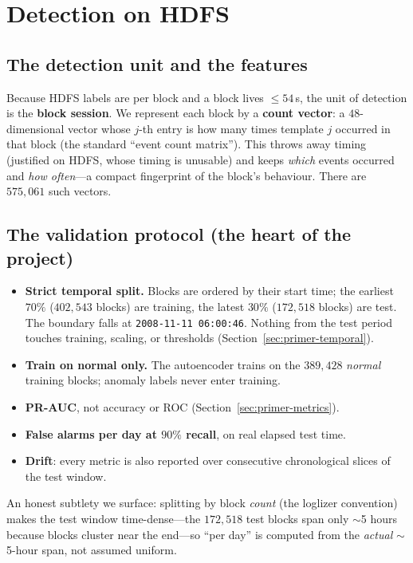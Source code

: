 \documentclass[11pt,a4paper]{article}
\newcommand{\keyword}[1]{\textbf{\color{accent}#1}}
\newcommand{\code}[1]{\texttt{\small #1}}
\begin{document}
\section{Detection on HDFS}
\label{sec:detect}

\subsection{The detection unit and the features}
Because HDFS labels are per block and a block lives $\leq54$\,s, the unit of
detection is the \keyword{block session}. We represent each block by a
\keyword{count vector}: a $48$-dimensional vector whose $j$-th entry is how many
times template $j$ occurred in that block (the standard ``event count matrix'').
This throws away timing (justified on HDFS, whose timing is unusable) and keeps
\emph{which} events occurred and \emph{how often}---a compact fingerprint of the
block's behaviour. There are $575{,}061$ such vectors.

\subsection{The validation protocol (the heart of the project)}
\begin{itemize}[nosep,leftmargin=1.5em]
  \item \keyword{Strict temporal split.} Blocks are ordered by their start time;
  the earliest $70\%$ ($402{,}543$ blocks) are training, the latest $30\%$
  ($172{,}518$ blocks) are test. The boundary falls at
  \code{2008-11-11 06:00:46}. Nothing from the test period touches training,
  scaling, or thresholds (Section~\ref{sec:primer-temporal}).
  \item \keyword{Train on normal only.} The autoencoder trains on the
  $389{,}428$ \emph{normal} training blocks; anomaly labels never enter training.
  \item \keyword{PR-AUC}, not accuracy or ROC (Section~\ref{sec:primer-metrics}).
  \item \keyword{False alarms per day at $90\%$ recall}, on real elapsed test
  time.
  \item \keyword{Drift}: every metric is also reported over consecutive
  chronological slices of the test window.
\end{itemize}
An honest subtlety we surface: splitting by block \emph{count} (the loglizer
convention) makes the test window time-dense---the $172{,}518$ test blocks span
only $\sim$5 hours because blocks cluster near the end---so ``per day'' is
computed from the \emph{actual} $\sim$5-hour span, not assumed uniform.
\end{document}
